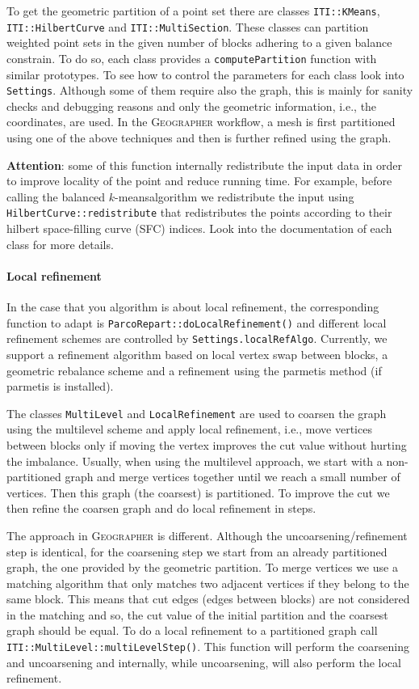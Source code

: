 \documentclass[a4paper,10pt]{article}
\newcommand{\geo}{\textsc{Geographer} }
\newcommand{\km}{$k$-means}
\newcommand{\att}{\textbf{Attention}: }
\newcommand{\MI}[1]{\texttt{#1}}
\begin{document}
To get the geometric partition of a point set there are classes \MI{ITI::KMeans},
\MI{ITI::HilbertCurve} and \MI{ITI::MultiSection}. These classes can partition weighted point sets in the given
number of blocks adhering to a given balance constrain. To do so, each class provides a 
\MI{computePartition} function with similar prototypes. To see how to control the parameters for
each class look into \MI{Settings}. Although some of them require also the
graph, this is mainly for sanity checks and debugging reasons and only the geometric information,
i.e., the coordinates, are used. 
In the \geo workflow, a mesh is first partitioned using one of the above techniques and
then is further refined using the graph.

\att some of this function internally redistribute the input data in order to improve locality of the
point and reduce running time. For example, before calling the balanced \km algorithm we redistribute
the input using \MI{HilbertCurve::redistribute} that redistributes the points according to their
hilbert space-filling curve (SFC) indices. Look into the documentation of each class for more details.

\paragraph*{Local refinement}
In the case that you algorithm is about local refinement, the corresponding function to
adapt is \MI{ParcoRepart::doLocalRefinement()} and different local refinement schemes are
controlled by \MI{Settings.localRefAlgo}. Currently, we support a refinement algorithm based 
on local vertex swap between blocks, a geometric rebalance scheme and a refinement using
the parmetis method (if parmetis is installed).

The classes \MI{MultiLevel} and \MI{LocalRefinement} are used to coarsen the graph using the
multilevel scheme and apply local refinement, i.e., move vertices between blocks only if moving
the vertex improves the cut value without hurting the imbalance.
Usually, when using the multilevel approach, we start with a non-partitioned graph and merge vertices
together until we reach a small number of vertices. Then this graph  (the coarsest) is partitioned. 
To improve the cut we then refine the coarsen graph and do local refinement in steps.

The approach in \geo is different.
Although the uncoarsening/refinement step is identical, for the coarsening step we start from an
already partitioned graph, the one provided by the geometric partition. To merge vertices we
use a matching algorithm that only matches two adjacent vertices if they belong to the same block.
This means that cut edges (edges between blocks) are not considered in the matching and so, the cut 
value of the initial partition and the coarsest graph should be equal.
To do a local refinement to a partitioned graph call \MI{ITI::MultiLevel::multiLevelStep()}. 
This function will perform the coarsening and uncoarsening and internally, while uncoarsening,
will also perform the local refinement.
\end{document}
